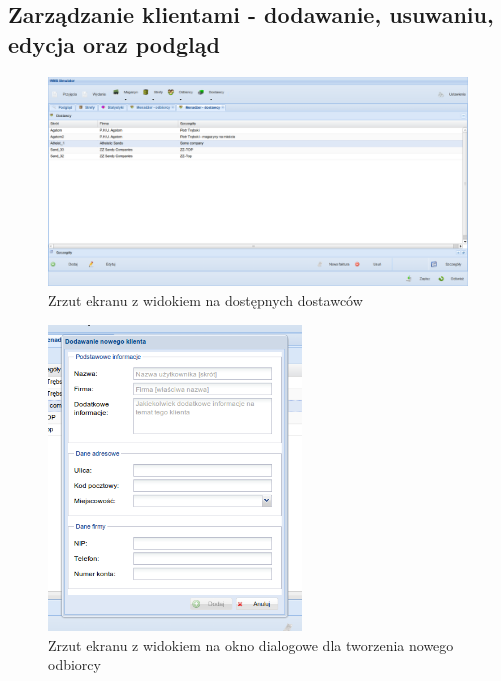	\subsection{Zarządzanie klientami - dodawanie, usuwaniu, edycja oraz podgląd}
		\begin{figure}[H]
			\centering
			\includegraphics[width=0.99\textwidth]{images/app/supplier_preview}
			\caption[Aplikacja - Dostęp do danych klientów]{Zrzut ekranu z widokiem na dostępnych dostawców}
			\label{c7:fig:app:supplier_preview}
		\end{figure}
		\begin{figure}[H]
			\centering
			\includegraphics[width=0.6\textwidth]{images/app/new_receipient_dialog}
			\caption[Aplikacja - Dodawania nowego klienta - odbiorcy]{Zrzut ekranu z widokiem na okno dialogowe dla tworzenia nowego odbiorcy}
			\label{c7:fig:app:new_receipient_dialog}
		\end{figure}
		
